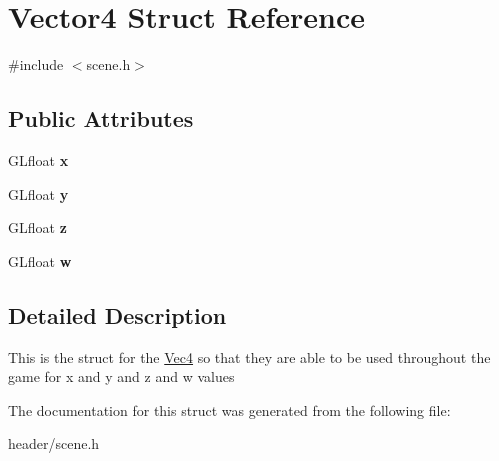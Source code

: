 \hypertarget{structVector4}{
\section{Vector4 Struct Reference}
\label{structVector4}
}


{\ttfamily \#include $<$scene.h$>$}\subsection*{Public Attributes}
\begin{DoxyCompactItemize}
\item 
\hypertarget{structVector4_a217098b33e968a26b5e6ff481ee04cf7}{
GLfloat {\bfseries x}}
\label{structVector4_a217098b33e968a26b5e6ff481ee04cf7}

\item 
\hypertarget{structVector4_a91f362cb35f1d3f37b29967450f45cd5}{
GLfloat {\bfseries y}}
\label{structVector4_a91f362cb35f1d3f37b29967450f45cd5}

\item 
\hypertarget{structVector4_afb1e3f931f0e733c93f867d3f16cce75}{
GLfloat {\bfseries z}}
\label{structVector4_afb1e3f931f0e733c93f867d3f16cce75}

\item 
\hypertarget{structVector4_afa300dc6085acd21cc95b44118ef42af}{
GLfloat {\bfseries w}}
\label{structVector4_afa300dc6085acd21cc95b44118ef42af}

\end{DoxyCompactItemize}


\subsection{Detailed Description}
This is the struct for the \hyperlink{classVec4}{Vec4} so that they are able to be used throughout the game for x and y and z and w values 

The documentation for this struct was generated from the following file:\begin{DoxyCompactItemize}
\item 
header/scene.h\end{DoxyCompactItemize}
